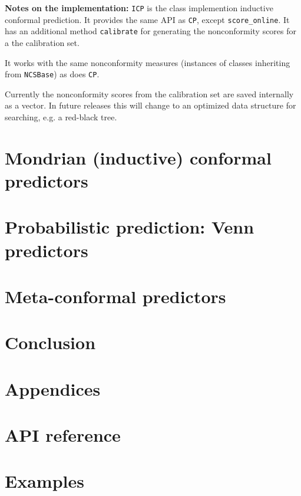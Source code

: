 \documentclass[twoside,11pt]{article}
\begin{document}
\noindent
\textbf{Notes on the implementation:}
\texttt{ICP} is the class implemention inductive conformal
prediction. It provides the same API as \texttt{CP},
except \texttt{score\_online}. It has an additional method
\texttt{calibrate} for generating the nonconformity scores
for a the calibration set.

It works with the same nonconformity measures (instances
of classes inheriting from \texttt{NCSBase}) as does
\texttt{CP}.

Currently the nonconformity scores from the calibration set
are saved internally as a vector. In future releases this
will change to an optimized data structure for searching,
e.g. a red-black tree.

\section{Mondrian (inductive) conformal predictors}

\section{Probabilistic prediction: Venn predictors}

\section{Meta-conformal predictors}

\section{Conclusion}

\renewcommand{\appendixpagename}{}
\begin{appendices}
  \section*{Appendices}

  \section{API reference}
  \label{appendix:a}

  \section{Examples}
  \label{appendix:b}

\end{appendices}


\end{document}
